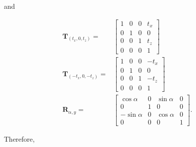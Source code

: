 \documentclass[10pt]{article}
\begin{document}
and

$$
\begin{aligned}
\mathbf{T}_{\left(t_{x}, 0, t_{z}\right)}= & {\left[\begin{array}{llll}
1 & 0 & 0 & t_{x} \\
0 & 1 & 0 & 0 \\
0 & 0 & 1 & t_{z} \\
0 & 0 & 0 & 1
\end{array}\right] } \\
\mathbf{T}_{\left(-t_{x}, 0,-t_{z}\right)}= & {\left[\begin{array}{cccc}
1 & 0 & 0 & -t_{x} \\
0 & 1 & 0 & 0 \\
0 & 0 & 1 & -t_{z} \\
0 & 0 & 0 & 1
\end{array}\right] } \\
\mathbf{R}_{\alpha, y}= & {\left[\begin{array}{cccc}
\cos \alpha & 0 & \sin \alpha & 0 \\
0 & 1 & 0 & 0 \\
-\sin \alpha & 0 & \cos \alpha & 0 \\
0 & 0 & 0 & 1
\end{array}\right] . }
\end{aligned}
$$

Therefore,
\end{document}
